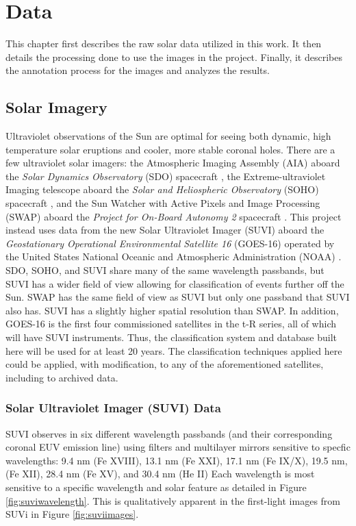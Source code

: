 \documentclass[twoside]{report}
\begin{document}
\chapter{Data} \label{ch:data}

This chapter first describes the raw solar data utilized in this work. It then details the processing done to use the images in the project. Finally, it describes the annotation process for the images and analyzes the results. 

\section{Solar Imagery}
Ultraviolet observations of the Sun are optimal for seeing both dynamic, high temperature solar eruptions and cooler, more stable coronal holes. There are a few ultraviolet solar imagers: the Atmospheric Imaging Assembly (AIA) aboard the \textit{Solar Dynamics Observatory} (SDO) spacecraft \cite{lemen:2012}, the Extreme-ultraviolet Imaging telescope aboard the \textit{Solar and Heliospheric Observatory} (SOHO) spacecraft \cite{eit}, and the Sun Watcher with Active Pixels and Image Processing (SWAP) aboard the \textit{Project for On-Board Autonomy 2} spacecraft \cite{halain:2013, seaton:2013}. This project instead uses data from the new Solar Ultraviolet Imager (SUVI) aboard the \textit{ Geostationary Operational Environmental Satellite 16} (GOES-16) operated by the United States National Oceanic and Atmospheric Administration (NOAA) \cite{suvibg, suvibg2}. SDO, SOHO, and SUVI share many of the same wavelength passbands, but SUVI has a wider field of view allowing for classification of events further off the Sun. SWAP has the same field of view as SUVI but only one passband that SUVI also has. SUVI has a slightly higher spatial resolution than SWAP. In addition, GOES-16 is the first four commissioned satellites in the t-R series, all of which will have SUVI instruments. Thus, the classification system and database built here will be used for at least 20 years. The classification techniques applied here could be applied, with modification, to any of the aforementioned satellites, including to archived data. 

\subsection{Solar Ultraviolet Imager (SUVI) Data}
SUVI observes in six different wavelength passbands (and their corresponding coronal EUV emission line) using filters and multilayer mirrors sensitive to specfic wavelengths: 9.4 nm (Fe XVIII), 13.1 nm (Fe XXI), 17.1 nm (Fe IX/X), 19.5 nm, (Fe XII), 28.4 nm (Fe XV), and 30.4 nm (He II) Each wavelength is most sensitive to a specific wavelength and solar feature as detailed in Figure \ref{fig:suviwavelength}. This is qualitatively apparent in the first-light images from SUVi in Figure \ref{fig:suviimages}.
\end{document}
